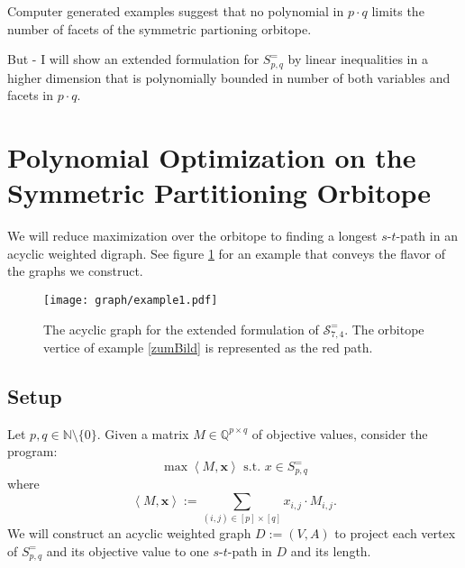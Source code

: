 \documentclass[a4paper]{amsart}
\theoremstyle{lemma}
\theoremstyle{definition}
\theoremstyle{remark}
\theoremstyle{example}
\newcommand{\lrX}[1]{\ensuremath{\left< #1 \right>}}
\newcommand{\M}{\ensuremath{\mathcal{M}}}
\newcommand{\calS}{\ensuremath{\mathcal{S}}}
\begin{document}

Computer generated examples suggest that no polynomial in \(p \cdot
q\) limits the number of facets of the symmetric partioning orbitope.

But - I will show an extended formulation for \(S^=_{p, q}\) by linear
inequalities in a higher dimension that is polynomially bounded in
number of both variables and facets in \(p \cdot q\).



\section{Polynomial Optimization on the  Symmetric Partitioning
  Orbitope}
\label{fluss}
We will reduce maximization over the orbitope to finding a longest
\(s\)-\(t\)-path in an acyclic weighted digraph.  See figure
\ref{example1graph} for an example that conveys the flavor of the
graphs we construct.

\begin{figure}
\texttt{[image: graph/example1.pdf]}
\caption{The acyclic graph for the extended formulation of
  \(\calS^=_{7, 4}\).  The orbitope vertice of example \ref{zumBild}
  is represented as the red path.}
\label{example1graph}
\end{figure}

\subsection{Setup}

Let \(p, q \in \mathbb{N} \setminus \{0\}\).  Given a matrix \(M \in
\mathbb{Q}^{p \times q}\) of objective values, consider the program:
\begin{equation}
\label{optS}
\max \lrX{M, \mathbf{x} }  \text{ s.t. } x \in S^=_{p, q}
\end{equation}
where \[\lrX{M, \mathbf{x} } := \sum_{(i, j)\in [p]\times [q]} x_{i, j}\cdot M_{i, j}\text{.}\]
We will construct an acyclic weighted graph \(D := (V, A)\) to project each vertex of
\(S^=_{p, q}\) and its objective value to one \(s\)-\(t\)-path in \(D\) and its length.
\end{document}

